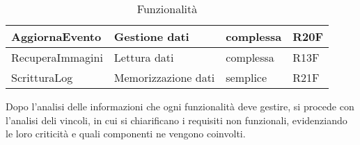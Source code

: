 \begin{table}[htbp]
\begin{tabular} {|P{3.8cm}|P{4.5cm}|P{2.5cm}|P{4cm}|}
        \hline
        AggiornaEvento        & Gestione dati                                                 & complessa                     & R20F                                            \\
        \hline
        RecuperaImmagini      & Lettura dati                                                  & complessa                     & R13F                                            \\
        \hline
        ScritturaLog          & Memorizzazione dati                                           & semplice                      & R21F                                            \\
        \hline
    \end{tabular}

    \caption{Funzionalità}
    \label{<label>}
\end{table}

Dopo l'analisi delle informazioni che ogni funzionalità deve gestire, si procede con l'analisi deli vincoli,
in cui si chiarificano i requisiti non funzionali, evidenziando le loro criticità e quali componenti ne vengono coinvolti.

